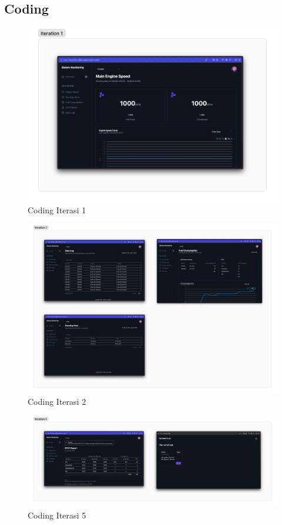 \begin{landscape}
    \newpage

    \subsection{Coding}\label{apdx:coding}

    \begin{figure}[!h]
        \includegraphics[width=.8\linewidth, center]{images/lampiran/coding/code-it1.png}
        \caption{Coding Iterasi 1}
        \label{fig:code-it1}
    \end{figure}

    \begin{figure}[!h]
        \includegraphics[width=.85\linewidth, center]{images/lampiran/coding/code-it2.png}
        \caption{Coding Iterasi 2}
        \label{fig:code-it2}
    \end{figure}

    \begin{figure}[!h]
        \includegraphics[width=1\linewidth, center]{images/lampiran/coding/code-it5.png}
        \caption{Coding Iterasi 5}
        \label{fig:code-it5}
    \end{figure}

\end{landscape}

